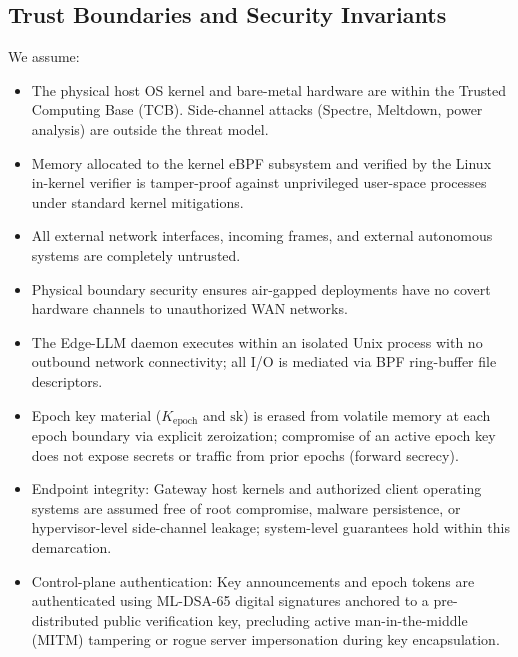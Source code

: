 \documentclass[journal]{IEEEtran}
\renewcommand{\_}{\textunderscore\allowbreak}
\begin{document}
\subsection{Trust Boundaries and Security Invariants}
We assume:
\begin{itemize}
  \item The physical host OS kernel and bare-metal hardware are within the Trusted
    Computing Base (TCB). Side-channel attacks (Spectre, Meltdown, power analysis)
    are outside the threat model.

  \item Memory allocated to the kernel eBPF subsystem and verified by the Linux
    in-kernel verifier is tamper-proof against unprivileged user-space processes
    under standard kernel mitigations.

  \item All external network interfaces, incoming frames, and external autonomous
    systems are completely untrusted.

  \item Physical boundary security ensures air-gapped deployments have no covert
    hardware channels to unauthorized WAN networks.

  \item The Edge-LLM daemon executes within an isolated Unix process with no
    outbound network connectivity; all I/O is mediated via BPF ring-buffer file
    descriptors.

  \item Epoch key material ($K_{\text{epoch}}$ and $\text{sk}$) is erased from
    volatile memory at each epoch boundary via explicit zeroization; compromise
    of an active epoch key does not expose secrets or traffic from prior epochs
    (forward secrecy).

  \item Endpoint integrity: Gateway host kernels and authorized client operating
    systems are assumed free of root compromise, malware persistence, or
    hypervisor-level side-channel leakage; system-level guarantees hold within this
    demarcation.

  \item Control-plane authentication: Key announcements and epoch tokens are
    authenticated using ML-DSA-65 digital signatures anchored to a pre-distributed
    public verification key, precluding active man-in-the-middle (MITM) tampering
    or rogue server impersonation during key encapsulation.
\end{itemize}
\end{document}
